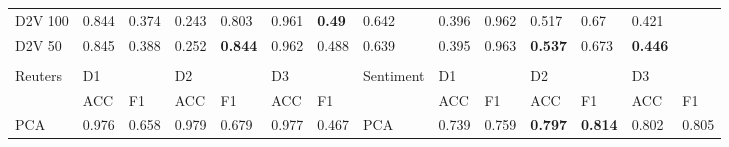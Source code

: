 \begin{landscape}
\begin{table}[]
\begin{tabular}{llllllllllllll}
D2V 100    & 0.844                           & 0.374                           & 0.243                           & 0.803                           & 0.961                           & \textbf{0.49}  & 0.642                           & 0.396                           & 0.962                           & 0.517                           & 0.67                            & 0.421                           &                                 \\
D2V 50     & 0.845                           & 0.388                           & 0.252                           & \textbf{0.844} & 0.962                           & 0.488                           & 0.639                           & 0.395                           & 0.963                           & \textbf{0.537} & 0.673                           & \textbf{0.446} &                                 \\
&                                 &                                 &                                 &                                 &                                 &                                 &                                 &                                 &                                 &                                 &                                 &                                 &                                 \\
Reuters    & D1                              &                                 & D2                              &                                 & D3                              &                                 & Sentiment                       & D1                              &                                 & D2                              &                                 & D3                              &                                 \\
& ACC                             & F1                              & ACC                             & F1                              & ACC                             & F1                              &                                 & ACC                             & F1                              & ACC                             & F1                              & ACC                             & F1                              \\
PCA        & 0.976                           & 0.658                           & 0.979                           & 0.679                           & 0.977                           & 0.467                           & PCA                             & 0.739                           & 0.759                           & \textbf{0.797} & \textbf{0.814} & 0.802                           & 0.805                           \\

\end{tabular}
\end{table}
\end{landscape}
